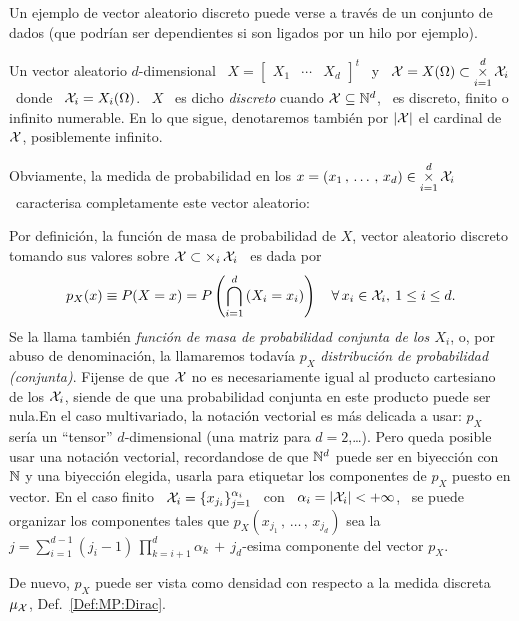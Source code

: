 
\label{Ssec:MP:VecDiscreto}

Un ejemplo de vector aleatorio discreto puede verse a trav\'es de un conjunto de
dados (que podr\'ian  ser dependientes si son ligados por  un hilo por ejemplo).

\begin{definicion}
\label{Def:MP:VectorAleatorioDiscreto}
%
  Un  vector aleatorio $d$-dimensional  \ $X  = \begin{bmatrix}  X_1 &  \cdots &
    X_d  \end{bmatrix}^t$   \  y  \   $\displaystyle  \mathcal{X}  =   X(\Omega)  \subset
  \operatorname*{\times}_{i=1}^d \mathcal{X}_i$ \  donde \ $\mathcal{X}_i = X_i(\Omega)$. \ $X$  \ es dicho {\it
    discreto} cuando  $\mathcal{X} \subseteq \mathbb{N}^d$,  \ es discreto, finito  o infinito
  numerable.  En lo  que sigue, denotaremos tambi\'en por  $|\mathcal{X}|$ el cardinal de
  $\mathcal{X}$, posiblemente infinito.
\end{definicion}

Obviamente, la  medida de probabilidad  en los $\displaystyle  x = (x_1 \,  , \,
\ldots \, , \, x_d)  \in \operatorname*{\times}_{i=1}^d \mathcal{X}_i$ \ caracterisa completamente este
vector aleatorio:
%
\begin{definicion}
\label{Def:MP:FuncionMasaConjunta}
%
  Por  definici\'on,  la  funci\'on  de  masa de  probabilidad  de  $X$,  vector
  aleatorio discreto tomando sus valores sobre $\mathcal{X} \subset \operatorname*{\times}_i \mathcal{X}_i$ \ es
  dada por
  \[
  p_X(x) \equiv  P(X =  x) =  P\left( \bigcap_{i=1}^d \left(  X_i =  x_i \right)
  \right) \quad \forall \, x_i \in \mathcal{X}_i, \: 1 \le i \le d.
  \]
  Se la llama  tambi\'en {\it funci\'on de masa de  probabilidad conjunta de los
    $X_i$}, o, por  abuso de denominaci\'on, la llamaremos  todav\'ia $p_X$ {\it
    distribuci\'on  de probabilidad  (conjunta)}.   Fijense de  que  $\mathcal{X}$ no  es
  necesariamente igual al  producto cartesiano de los $\mathcal{X}_i$,  siende de que una
  probabilidad  conjunta en  este producto  puede ser  nula.\newline En  el caso
  multivariado, la notaci\'on vectorial es  m\'as delicada a usar: $p_X$ ser\'ia
  un ``tensor''  $d$-dimensional (una matriz  para $d = 2$,\ldots).   Pero queda
  posible usar una notaci\'on vectorial, recordandose de que $\mathbb{N}^d$ puede ser
  en biyecci\'on  con $\mathbb{N}$ y  una biyecci\'on elegida, usarla  para etiquetar
  los componentes  de $p_X$ puesto en  vector.  En el  caso finito \ $\mathcal{X}_i  = \{
  x_{j_i} \}_{j=1}^{\alpha_i}$ \ con \ $\alpha_i = |\mathcal{X}_i| < +\infty$, \ se puede
  organizar  los  componentes tales  que  $p_X(x_{j_1}\, ,  \,  \ldots  \, ,  \,
  x_{j_d})$  sea   la  $\displaystyle  j   =  \sum_{i=1}^{d-1}  (j_i  -   1)  \,
  \prod_{k=i+1}^d \alpha_k \, + \, j_d$-esima componente del vector $p_X$.
\end{definicion}
%
\noindent De nuevo, $p_X$ puede ser  vista como densidad con respecto a la medida
discreta $\mu_{\mathcal{X}}$, Def.~\ref{Def:MP:Dirac}.

